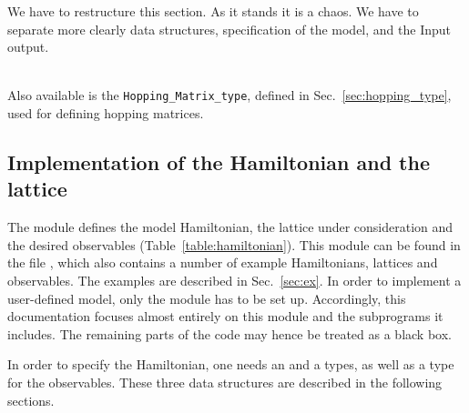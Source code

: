 

{\color{red}   We have to restructure this  section.   As it  stands it is a  chaos. We have to separate more clearly data structures, specification of the model, and  the Input output. }

\\
Also available is the \texttt{Hopping\_Matrix\_type}, defined in Sec.~\ref{sec:hopping_type}, used for defining hopping matrices.


\subsection{Implementation of the Hamiltonian and the lattice} 
\label{sec:hamiltonian}



The module  defines the model Hamiltonian, the lattice under consideration and the desired observables (Table~\ref{table:hamiltonian}). This module can be found in the file , which also contains a number of example Hamiltonians, lattices and observables.  The examples are described in Sec.~\ref{sec:ex}.
In order to implement a user-defined model, only the module  has to be set up. Accordingly, this documentation focuses almost entirely  on this module and the subprograms it includes.
The remaining parts of the code may hence be treated as a black box.  

In order to specify the Hamiltonian, one needs  an   and a  types, as well as a type for the observables. These three data structures are described in the following sections.

